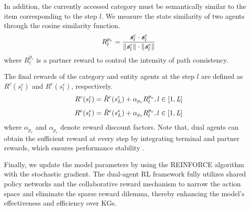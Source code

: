 \documentclass[conference]{IEEEtran}
\begin{document}


In addition, the currently accessed category must be semantically similar to the item corresponding to the step $l$. We measure the state similarity of two agents through the cosine similarity function. 
\begin{equation}
R^{p_e}_l= \frac{{\textbf{\textit{s}}_l^c \cdot \textbf{\textit{s}}_l^e}}{{\|\textbf{\textit{s}}_l^c\| \cdot \|\textbf{\textit{s}}_l^e\|}}
\end{equation}
where $R^{p_e}_l$ is a partner reward to control the intensity of path consistency.

The final rewards of the category and entity agents at the step $l$ are defined as $R^{c}(s_l^c)$ and $R^{e}(s_l^e)$, respectively. 
\begin{equation}
   R^{c}(s_l^c)=\Tilde{R}^c(s_L^c) + \alpha_{p_e}R^{p_e}_l, l \in [1,\emph{L}]
\end{equation}
\begin{equation}
   R^{e}(s_l^e)=\Tilde{R}^e(s_L^e)+ \alpha_{p_c} R^{p_c}_l, l \in [1,\emph{L}]
\end{equation}
where $\alpha_{p_e}$ and $\alpha_{p_c}$ denote reward discount factors. Note that, dual agents can obtain the sufficient reward at every step by integrating terminal and partner rewards, which ensures performance stability \cite{DREAM}\cite{MARLsurvey1}.


Finally, we update the model parameters by using the REINFORCE algorithm \cite{REINFORCE} with the stochastic gradient. The dual-agent RL framework fully utilizes shared policy networks and the collaborative reward mechanism to narrow the action space and eliminate the sparse reward dilemma, thereby enhancing the model's effectiveness and efficiency over KGs. %
\end{document}
